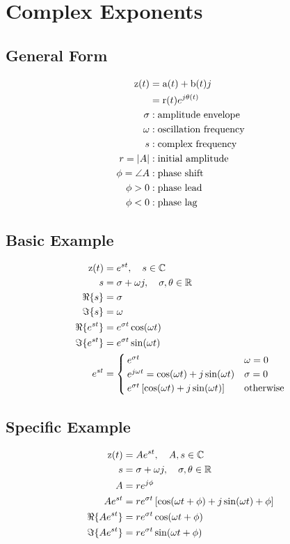 \section*{Complex Exponents}
\subsection*{General Form}
\begin{align*}
    \func{z}[t] &= \func{a}[t]+\func{b}[t]j \\
                &= \func{r}[t]e^{j\func{\theta}[t]} \\
    \sigma &: \text{amplitude envelope} \\
    \omega &: \text{oscillation frequency} \\
    s &: \text{complex frequency} \\
    r = |A| &: \text{initial amplitude} \\
    \phi = \angle A &: \text{phase shift} \\
    \phi > 0 &: \text{phase lead} \\
    \phi < 0 &: \text{phase lag}
\end{align*}

\subsection*{Basic Example}
\begin{align*}
    \func{z}[t] &= e^{st}, \quad s \in \mathbb{C} \\
    s &= \sigma + \omega j, \quad \sigma, \theta \in \mathbb{R} \\
    \Re{s} &= \sigma \\
    \Im{s} &= \omega \\
    \Re{e^{st}} &= e^{\sigma t} \cos{\omega t} \\
    \Im{e^{st}} &= e^{\sigma t} \sin{\omega t} \\
    e^{st} &= \begin{cases}
        e^{\sigma t} & \omega = 0 \\
        e^{j \omega t} = \cos{\omega t} + j \sin{\omega t} & \sigma = 0 \\
        e^{\sigma t} \left[\cos{\omega t}+j\sin{\omega t}\right] & \text{otherwise}
    \end{cases}
\end{align*}

\subsection*{Specific Example}
\begin{align*}
    \func{z}[t] &= Ae^{st}, \quad A, s \in \mathbb{C} \\
    s &= \sigma + \omega j, \quad \sigma, \theta \in \mathbb{R} \\
    A &= r e^{j \phi} \\
    Ae^{st} &= r e^{\sigma t} \left[\cos{\omega t + \phi}+j\sin{\omega t} + \phi\right] \\
    \Re{Ae^{st}} &= r e^{\sigma t} \cos{\omega t + \phi} \\
    \Im{Ae^{st}} &= r e^{\sigma t} \sin{\omega t + \phi}
\end{align*}